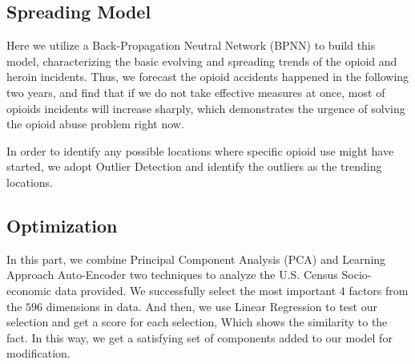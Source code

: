 \documentclass{mcmthesis}
\begin{document}
\subsection*{Spreading Model }
Here we utilize a Back-Propagation Neutral Network (BPNN) to build this model, characterizing the basic evolving and spreading trends of the opioid and heroin incidents. Thus, we forecast the opioid accidents happened in the following two years, and find that if we do not take effective measures at once, most of opioids incidents will increase sharply, which demonstrates the urgence of solving the opioid abuse problem right now.

In order to identify any possible locations where specific opioid use might have started, we adopt Outlier Detection and identify the outliers as the trending locations.

\subsection*{Optimization}
 In this part, we combine Principal Component Analysis (PCA) and Learning Approach Auto-Encoder two techniques to analyze the U.S. Census Socio-economic data provided. We successfully select the most important $4$ factors from the $596$ dimensions in data. And then, we use Linear Regression to test our selection and get a score for each selection, Which shows the similarity to the fact. In this way, we get a satisfying set of components added to our model for modification. 
\end{document}
